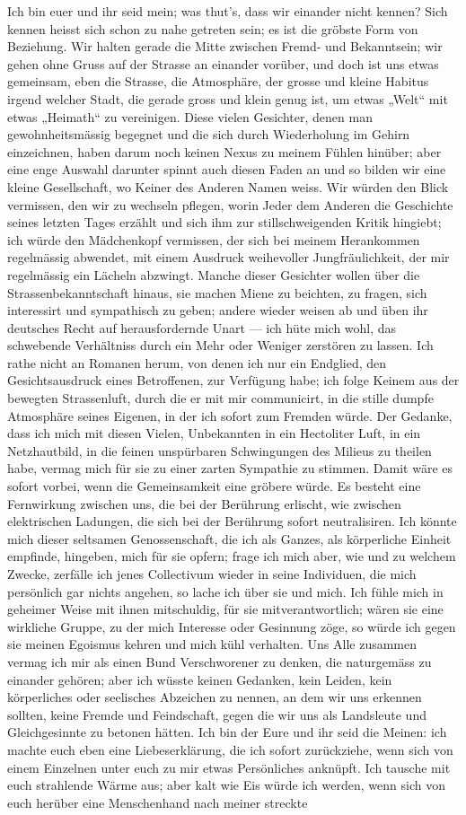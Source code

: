  Ich bin euer und ihr seid mein; was thut’s, dass wir einander nicht kennen? Sich kennen heisst sich schon zu nahe getreten sein; es ist die gröbste Form von Beziehung. Wir halten gerade die Mitte zwischen Fremd- und Bekanntsein; wir gehen ohne Gruss auf der Strasse an einander vorüber, und doch ist uns etwas gemeinsam, eben die Strasse, die Atmosphäre, der grosse und kleine Habitus irgend welcher Stadt, die gerade gross und klein genug ist, um etwas „Welt“ mit etwas „Heimath“ zu vereinigen. Diese vielen Gesichter, denen man gewohnheitsmässig begegnet und die sich durch Wiederholung im Gehirn einzeichnen, haben darum noch keinen Nexus zu meinem Fühlen hinüber; aber eine enge Auswahl darunter spinnt auch diesen Faden an und so bilden wir eine kleine Gesellschaft, wo Keiner des Anderen Namen weiss. Wir würden den Blick vermissen, den wir zu wechseln pflegen, worin Jeder dem Anderen die Geschichte seines letzten Tages erzählt und sich ihm zur stillschweigenden Kritik hingiebt; ich würde den Mädchenkopf vermissen, der sich bei meinem Herankommen regelmässig abwendet, mit einem Ausdruck weihevoller Jungfräulichkeit, der mir regelmässig ein Lächeln abzwingt. Manche dieser Gesichter wollen über die Strassenbekanntschaft hinaus, sie machen Miene zu beichten, zu fragen, sich interessirt und sympathisch zu geben; andere wieder weisen ab und üben ihr deutsches Recht auf herausfordernde Unart — ich hüte mich wohl, das schwebende Verhältniss durch ein Mehr oder Weniger zerstören zu lassen. Ich rathe nicht an Romanen herum, von denen ich nur ein Endglied, den Gesichtsausdruck eines Betroffenen, zur Verfügung habe; ich folge Keinem aus der bewegten Strassenluft, durch die er mit mir communicirt, in die stille dumpfe Atmosphäre seines Eigenen, in der ich sofort zum Fremden würde. Der Gedanke, dass ich mich mit diesen Vielen, Unbekannten in ein Hectoliter Luft, in ein Netzhautbild, in die feinen unspürbaren Schwingungen des Milieus zu theilen habe, vermag mich für sie zu einer zarten Sympathie zu stimmen. Damit wäre es sofort vorbei, wenn die Gemeinsamkeit eine gröbere würde. Es besteht eine Fernwirkung zwischen uns, die bei der Berührung erlischt, wie zwischen elektrischen Ladungen, die sich bei der Berührung sofort neutralisiren. Ich könnte mich dieser seltsamen Genossenschaft, die ich als Ganzes, als körperliche Einheit empfinde, hingeben, mich für sie opfern; frage ich mich aber, wie und zu welchem Zwecke, zerfälle ich jenes Collectivum wieder in seine Individuen, die mich persönlich gar nichts angehen, so lache ich über sie und mich. Ich fühle mich in geheimer Weise mit ihnen mitschuldig, für sie mitverantwortlich; wären sie eine wirkliche Gruppe, zu der mich Interesse oder Gesinnung zöge, so würde ich gegen sie meinen Egoismus kehren und mich kühl verhalten. Uns Alle zusammen vermag ich mir als einen Bund Verschworener zu denken, die naturgemäss zu einander gehören; aber ich wüsste keinen Gedanken, kein Leiden, kein körperliches oder seelisches Abzeichen zu nennen, an dem wir uns erkennen sollten, keine Fremde und Feindschaft, gegen die wir uns als Landsleute und Gleichgesinnte zu betonen hätten. Ich bin der Eure und ihr seid die Meinen: ich machte euch eben eine Liebeserklärung, die ich sofort zurückziehe, wenn sich von einem Einzelnen unter euch zu mir etwas Persönliches anknüpft. Ich tausche mit euch strahlende Wärme aus; aber kalt wie Eis würde ich werden, wenn sich von euch herüber eine Menschenhand nach meiner streckte 
\par

